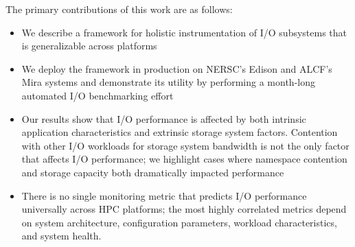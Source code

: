 The primary contributions of this work are as follows:
\begin{itemize}
\item We describe a framework for holistic instrumentation of I/O subsystems that is
generalizable across platforms 
\item We deploy the framework in production on NERSC's Edison and ALCF's Mira systems and demonstrate its utility by performing a month-long automated I/O benchmarking effort 
\item Our results show that I/O performance is affected by both intrinsic application characteristics and extrinsic storage system factors. Contention with other I/O workloads for storage system bandwidth is not the only factor that affects I/O performance; %
we highlight cases  where namespace contention and storage capacity both dramatically impacted performance
\item There is no single monitoring metric that predicts I/O performance
universally across HPC platforms; the most highly correlated metrics depend
on system architecture, configuration parameters, workload characteristics,
and system health.
\end{itemize}

